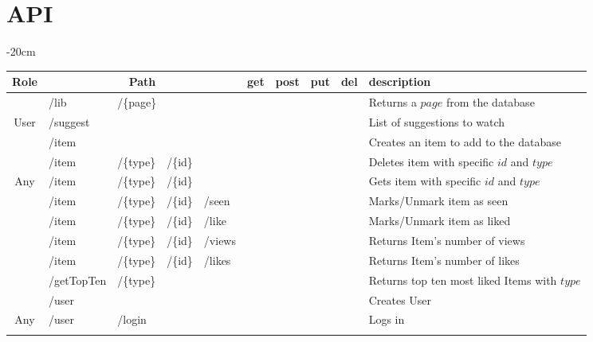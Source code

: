 \documentclass[oneside]{article}
\newcommand{\xmark}{\ding{53}} %
\begin{document}
\section{API}
\label{sec:api}
\begin{table}[H]
  \centering
  \addtolength{\leftskip} {-20cm}
  \addtolength{\rightskip}{-20cm}
  \begin{adjustbox}{width=1.3\textwidth}
  \begin{tabular}{ c|l l l l|c|c|c|c|l }
    \rowcolor{Gray}
    Role & \multicolumn{4}{c|}{Path} & get & post & put & del & description 
    \\ \hline
    & /lib & \multicolumn{3}{l|}{/\{page\}} &
    \xmark & & & &
    Returns a $page$ from the database
    \\
    \multirow{-2}{*}{User} & 
    \multicolumn{4}{l|}{/suggest} &
     & \xmark & & &
    List of suggestions to watch
    \\ \hhline{-|----|-|-|-|-|~} \rowcolor{Gray}
    & /item & & & &
    & \xmark & & &
    Creates an item to add to the database
    \\ \rowcolor{Gray}
    \multirow{-2}{*}{Admin} &
    /item & /\{type\} & /\{id\} & &
     & & & \xmark &
    Deletes item with specific $id$ and $type$ 
    \\ \hhline{-|----|-|-|-|-|~}
    Any &
    /item & /\{type\} & /\{id\} & &
    \xmark & & & &
    Gets item with specific $id$ and $type$ 
    \\ \hhline{-|----|-|-|-|-|~} \rowcolor{Gray}
    & /item & /\{type\} & /\{id\} & /seen &
    & & \xmark & \xmark &
    Marks/Unmark item as seen
    \\ \rowcolor{Gray}
    \multirow{-2}{*}{User}
    & /item & /\{type\} & /\{id\} & /like &
    & & \xmark & \xmark &
    Marks/Unmark item as liked
    \\ \hhline{-|----|-|-|-|-|~}
    & /item & /\{type\} & /\{id\} & /views &
    \xmark & & & &
    Returns Item's number of views
    \\
    & /item & /\{type\} & /\{id\} & /likes &
    \xmark & & & &
    Returns Item's number of likes
    \\ 
    & /getTopTen & /\{type\} &  &  &
    \xmark & & & &
    Returns top ten most liked Items with $type$
    \\ 
    & \multicolumn{4}{l|}{/user} &
    & \xmark & & &
    Creates User
    \\
    \multirow{-5}{*}{Any} 
    & /user & \multicolumn{3}{l|}{/login} &
    \xmark & & & &
    Logs in
    \\ \hhline{-|----|-|-|-|-|~} \rowcolor{Gray}

\end{tabular}
\end{adjustbox}
\end{table}
\end{document}
